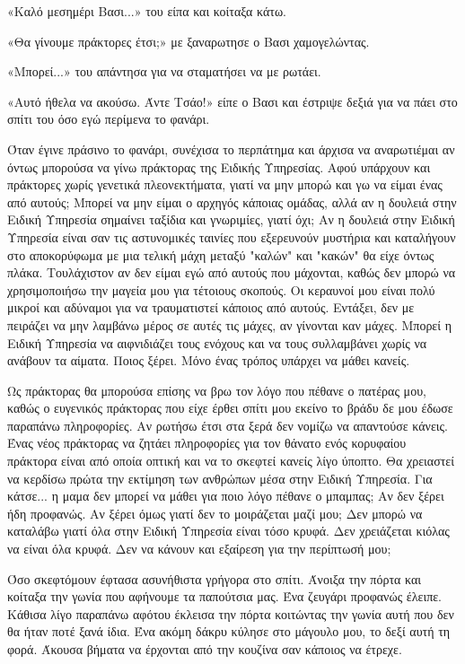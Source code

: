 \documentclass[12pt,twoside, openany]{book}
\begin{document}
«Καλό μεσημέρι Βασι...» του είπα και κοίταξα κάτω.

«Θα γίνουμε πράκτορες έτσι;» με ξαναρωτησε ο Βασι χαμογελώντας.

«Μπορεί...» του απάντησα για να σταματήσει να με ρωτάει.

«Αυτό ήθελα να ακούσω. Άντε Τσάο!» είπε ο Βασι και έστριψε δεξιά για να πάει στο σπίτι του όσο εγώ περίμενα το φανάρι.

Όταν έγινε πράσινο το φανάρι, συνέχισα το περπάτημα και άρχισα να αναρωτιέμαι αν όντως μπορούσα να γίνω πράκτορας της Ειδικής Υπηρεσίας. Αφού υπάρχουν και πράκτορες χωρίς γενετικά πλεονεκτήματα, γιατί να μην μπορώ και γω να είμαι ένας από αυτούς; Μπορεί να μην είμαι ο αρχηγός κάποιας ομάδας, αλλά αν η δουλειά στην Ειδική Υπηρεσία σημαίνει ταξίδια και γνωριμίες, γιατί όχι; Αν η δουλειά στην Ειδική Υπηρεσία είναι σαν τις αστυνομικές ταινίες που εξερευνούν μυστήρια και καταλήγουν στο αποκορύφωμα με μια τελική μάχη μεταξύ "καλών" και "κακών" θα είχε όντως πλάκα. Τουλάχιστον αν δεν είμαι εγώ από αυτούς που μάχονται, καθώς δεν μπορώ να χρησιμοποιήσω την μαγεία μου για τέτοιους σκοπούς. Οι κεραυνοί μου είναι πολύ μικροί και αδύναμοι για να τραυματιστεί κάποιος από αυτούς. Εντάξει, δεν με πειράζει να μην λαμβάνω μέρος σε αυτές τις μάχες, αν γίνονται καν μάχες. Μπορεί η Ειδική Υπηρεσία να αιφνιδιάζει τους ενόχους και να τους συλλαμβάνει χωρίς να ανάβουν τα αίματα. Ποιος ξέρει. Μόνο ένας τρόπος υπάρχει να μάθει κανείς.

Ως πράκτορας θα μπορούσα επίσης να βρω τον λόγο που πέθανε ο πατέρας μου, καθώς ο ευγενικός πράκτορας που είχε έρθει σπίτι μου εκείνο το βράδυ δε μου έδωσε παραπάνω πληροφορίες. Αν ρωτήσω έτσι στα ξερά δεν νομίζω να απαντούσε κάνεις. Ένας νέος πράκτορας να ζητάει πληροφορίες για τον θάνατο ενός κορυφαίου πράκτορα είναι από οποία οπτική και να το σκεφτεί κανείς λίγο ύποπτο. Θα χρειαστεί να κερδίσω πρώτα την εκτίμηση των ανθρώπων μέσα στην Ειδική Υπηρεσία. Για κάτσε... η μαμα δεν μπορεί να μάθει για ποιο λόγο πέθανε ο μπαμπας; Αν δεν ξέρει ήδη προφανώς. Αν ξέρει όμως γιατί δεν το μοιράζεται μαζί μου; Δεν μπορώ να καταλάβω γιατί όλα στην Ειδική Υπηρεσία είναι τόσο κρυφά. Δεν χρειάζεται κιόλας να είναι όλα κρυφά. Δεν να κάνουν και εξαίρεση για την περίπτωσή μου; 

Όσο σκεφτόμουν έφτασα ασυνήθιστα γρήγορα στο σπίτι. Άνοιξα την πόρτα και κοίταξα την γωνία που αφήνουμε τα παπούτσια μας. Ένα ζευγάρι προφανώς έλειπε. Κάθισα λίγο παραπάνω αφότου έκλεισα την πόρτα κοιτώντας την γωνία αυτή που δεν θα ήταν ποτέ ξανά ίδια. Ένα ακόμη δάκρυ κύλησε στο μάγουλο μου, το δεξί αυτή τη φορά. Άκουσα βήματα να έρχονται από την κουζίνα σαν κάποιος να έτρεχε.
\end{document}
